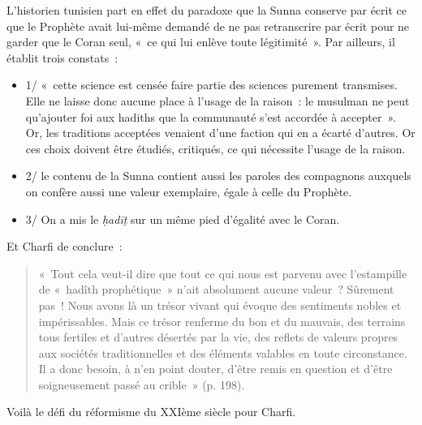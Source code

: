 L'historien tunisien part en effet du paradoxe que la Sunna conserve par
écrit ce que le Prophète avait lui-même demandé de ne pas retranscrire
par écrit pour ne garder que le Coran seul, «~ce qui lui enlève toute
légitimité~». Par ailleurs, il établit
trois constats~:
\begin{itemize}
    \item 1/ «~cette science est censée faire partie des sciences purement
transmises. Elle ne laisse donc aucune place à l'usage de la raison~: le
musulman ne peut qu'ajouter foi aux hadiths que la communauté s'est
accordée à accepter~». Or, les traditions acceptées venaient d'une
faction qui en a écarté d'autres. Or ces choix doivent être étudiés,
critiqués, ce qui nécessite l'usage de la raison.

\item 2/ le contenu de la Sunna contient aussi les paroles des compagnons
auxquels on confère aussi une valeur exemplaire, égale à celle du
Prophète.

\item 3/ On a mis le \emph{ḥadīṯ} sur un même pied d'égalité avec le Coran.

\end{itemize}

Et Charfi de conclure~: 
\begin{quote}
    
«~Tout cela veut-il dire que tout ce qui nous
est parvenu avec l'estampille de «~hadîth prophétique~» n'ait absolument
aucune valeur~? Sûrement pas~! Nous avons là un trésor vivant qui évoque
des sentiments nobles et impérissables. Mais ce trésor renferme du bon
et du mauvais, des terrains tous fertiles et d'autres désertés par la
vie, des reflets de valeurs propres aux sociétés traditionnelles et des
éléments valables en toute circonstance. Il a donc besoin, à n'en point
douter, d'être remis en question et d'être soigneusement passé au
crible~» (p. 198). 
\end{quote}
Voilà le défi du réformisme du XXIème siècle pour
Charfi.


